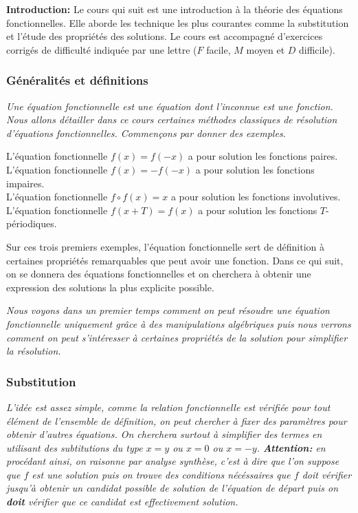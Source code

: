 \textbf{Introduction:} Le cours qui suit est une introduction à la théorie des équations fonctionnelles. Elle aborde les technique les plus courantes comme la substitution et l'étude des propriétés des solutions. Le cours est accompagné d'exercices corrigés de difficulté indiquée par une lettre ($F$ facile, $M$ moyen et $D$ difficile).

\subsubsection{Généralités et définitions}

\emph{Une équation fonctionnelle est une équation dont l'inconnue est une fonction. Nous allons détailler dans ce cours certaines méthodes classiques de résolution d'équations fonctionnelles. Commençons par donner des exemples.}
\begin{ex}
L'équation fonctionnelle $f(x)=f(-x)$ a pour solution les fonctions paires.
\\
L'équation fonctionnelle $f(x)=-f(-x)$ a pour solution les fonctions impaires.
\\
L'équation fonctionnelle $f\circ f(x) = x$ a pour solution les fonctions involutives.
\\
L'équation fonctionnelle $f(x+T)=f(x) $ a pour solution les fonctions $T$-périodiques.
\end{ex}

\begin{rem}
Sur ces trois premiers exemples, l'équation fonctionnelle sert de définition à certaines propriétés remarquables que peut avoir une fonction. Dans ce qui suit, on se donnera des équations fonctionnelles et on cherchera à obtenir une expression des solutions la plus explicite possible.
\end{rem}

\emph{Nous voyons dans un premier temps comment on peut résoudre une équation fonctionnelle uniquement grâce à des manipulations algébriques puis nous verrons comment on peut s'intéresser à certaines propriétés de la solution pour simplifier la résolution.}


\subsubsection{Substitution}

\emph{L'idée est assez simple, comme la relation fonctionnelle est vérifiée pour tout élément de l'ensemble de définition, on peut chercher à fixer des paramètres pour obtenir d'autres équations. On cherchera surtout à simplifier des termes en utilisant des subtitutions du type $x=y$ ou $x=0$ ou $x=-y$. \textbf{Attention:} en procédant ainsi, on raisonne par analyse synthèse, c'est à dire que l'on suppose que $f$ est une solution puis on trouve des conditions nécéssaires que $f$ doit vérifier jusqu'à obtenir un candidat possible de solution de l'équation de départ puis on \textbf{doit} vérifier que ce candidat est effectivement solution. }

